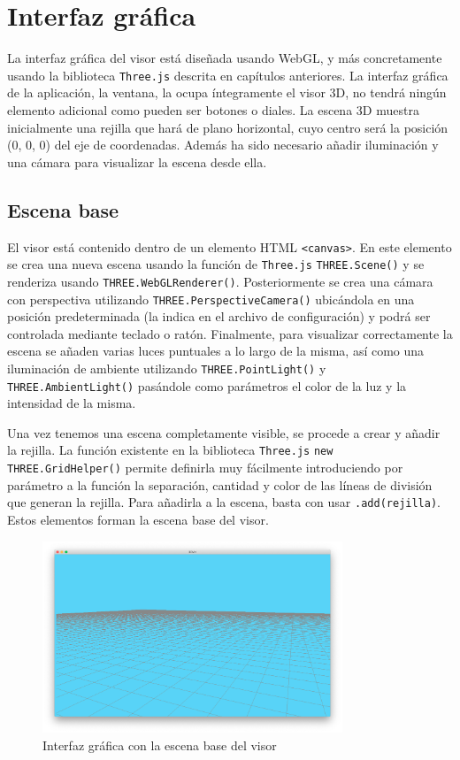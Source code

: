 \section{Interfaz gráfica}
La interfaz gráfica del visor está diseñada usando WebGL, y más concretamente usando la biblioteca \texttt{Three.js} descrita en capítulos anteriores. La interfaz gráfica de la aplicación, la ventana, la ocupa íntegramente el visor 3D, no tendrá ningún elemento adicional como pueden ser botones o diales. La escena 3D muestra inicialmente una rejilla que hará de plano horizontal, cuyo centro será la posición (0, 0, 0) del eje de coordenadas. Además ha sido necesario añadir iluminación y una cámara para visualizar la escena desde ella.

\subsection{Escena base}
El visor está contenido dentro de un elemento HTML \texttt{<canvas>}. En este elemento se crea una nueva escena usando la función de \texttt{Three.js} \texttt{THREE.Scene()} y se renderiza usando \texttt{THREE.WebGLRenderer()}. Posteriormente se crea una cámara con perspectiva utilizando \texttt{THREE.PerspectiveCamera()} ubicándola en una posición predeterminada (la indica en el archivo de configuración) y podrá ser controlada mediante teclado o ratón. Finalmente, para visualizar correctamente la escena se añaden varias luces puntuales a lo largo de la misma, así como una iluminación de ambiente utilizando \texttt{THREE.PointLight()} y \texttt{THREE.AmbientLight()} pasándole como parámetros el color de la luz y la intensidad de la misma.

Una vez tenemos una escena completamente visible, se procede a crear y añadir la rejilla. La función existente en la biblioteca \texttt{Three.js} \texttt{new THREE.GridHelper()} permite definirla muy fácilmente introduciendo por parámetro a la función la separación, cantidad y color de las líneas de división que generan la rejilla. Para añadirla a la escena, basta con usar \texttt{.add(rejilla)}. Estos elementos forman la escena base del visor.

\begin{figure}[H]
  \begin{center}
    \includegraphics[width=0.8\textwidth]{figures/interfazinicial.png}
		\caption{Interfaz gráfica con la escena base del visor}
		\label{fig.interfazinicial}
		\end{center}
\end{figure}

